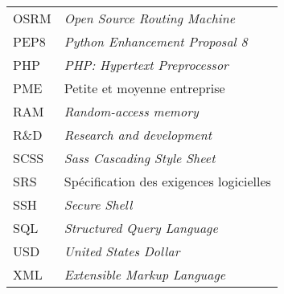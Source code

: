 \begin{longtable}{lp{5in}}
OSRM      & \textit{Open Source Routing Machine}\\
PEP8      & \textit{Python Enhancement Proposal 8}\\
PHP       & \textit{PHP: Hypertext Preprocessor}\\
PME       & Petite et moyenne entreprise\\
RAM       & \textit{Random-access memory}\\
R\&D      & \textit{Research and development}\\
SCSS      & \textit{Sass Cascading Style Sheet}\\
SRS       & Spécification des exigences logicielles\\
SSH       & \textit{Secure Shell}\\
SQL       & \textit{Structured Query Language}\\
USD       & \textit{United States Dollar}\\
XML       & \textit{Extensible Markup Language}\\

\end{longtable}
